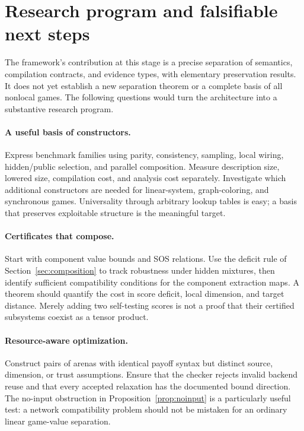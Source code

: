 \section{Research program and falsifiable next steps}
\label{sec:research}

The framework's contribution at this stage is a precise separation of
semantics, compilation contracts, and evidence types, with elementary
preservation results. It does not yet establish a new separation theorem or
a complete basis of all nonlocal games. The following questions would turn
the architecture into a substantive research program.

\paragraph{A useful basis of constructors.}
Express benchmark families using parity, consistency, sampling, local wiring,
hidden/public selection, and parallel composition. Measure description size,
lowered size, compilation cost, and analysis cost separately. Investigate
which additional constructors are needed for linear-system, graph-coloring,
and synchronous games. Universality through arbitrary lookup tables is easy;
a basis that preserves exploitable structure is the meaningful target.

\paragraph{Certificates that compose.}
Start with component value bounds and SOS relations. Use the deficit rule of
Section~\ref{sec:composition} to track robustness under hidden mixtures, then
identify sufficient compatibility conditions for the component extraction
maps. A theorem should quantify the cost in score deficit, local dimension,
and target distance. Merely adding two self-testing scores is not a proof
that their certified subsystems coexist as a tensor product.

\paragraph{Resource-aware optimization.}
Construct pairs of arenas with identical payoff syntax but distinct source,
dimension, or trust assumptions. Ensure that the checker rejects invalid
backend reuse and that every accepted relaxation has the documented bound
direction. The no-input obstruction in Proposition~\ref{prop:noinput} is a
particularly useful test: a network compatibility problem should not be
mistaken for an ordinary linear game-value separation.

